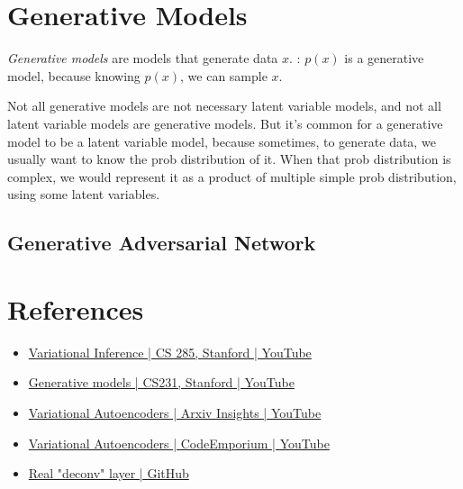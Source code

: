 \section{Generative Models}
\textit{Generative models} are models that generate data $x$. \Eg: $p(x)$ is a generative model, because knowing $p(x)$, we can sample $x$.

\note Not all generative models are not necessary latent variable models, and not all latent variable models are generative models. But it's common for a generative model to be a latent variable model, because sometimes, to generate data, we usually want to know the \ac{prob} distribution of it. When that \ac{prob} distribution is complex, we would represent it as a product of multiple simple \ac{prob} distribution, using some latent variables.

\subsection{Generative Adversarial Network}

\section{References}
\begin{itemize}
	\item \href{https://youtu.be/UTMpM4orS30}{Variational Inference | CS 285, Stanford | YouTube}
	\item \href{https://youtu.be/5WoItGTWV54}{Generative models | CS231, Stanford | YouTube}
	\item \href{https://youtu.be/9zKuYvjFFS8}{Variational Autoencoders | Arxiv Insights | YouTube}
	\item \href{https://youtu.be/fcvYpzHmhvA}{Variational Autoencoders | CodeEmporium | YouTube}
	\item \href{https://github.com/vdumoulin/conv_arithmetic}{Real "deconv" layer | GitHub}
\end{itemize}